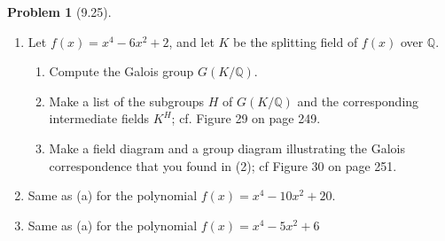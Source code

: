 \documentclass[12pt]{article}
\theoremstyle{definition}
\newtheorem{problem}{Problem}
\begin{document}
\begin{problem}[9.25]
    \phantom{.}
    \begin{enumerate}[label=(\alph*)]
        \item Let $f(x) = x^4 - 6x^2 + 2$, and let $K$ be the splitting field of $f(x)$ over $\mathbb{Q}$.
              \begin{enumerate}[label=(\arabic*)]
                  \item Compute the Galois group $G(K/\mathbb{Q})$.
                  \begin{solution}

                  \end{solution}

                  \item Make a list of the subgroups $H$ of $G(K/\mathbb{Q})$ and the corresponding intermediate fields $K^H$; cf. Figure 29 on page 249.
                  \begin{solution}

                  \end{solution}

                  \item Make a field diagram and a group diagram illustrating the Galois correspondence that you found in (2); cf Figure 30 on page 251.
                  \begin{solution}

                  \end{solution}
              \end{enumerate}

        \item Same as (a) for the polynomial $f(x) = x^4 - 10x^2 + 20$.
        \begin{solution}

        \end{solution}

        \item Same as (a) for the polynomial $f(x) = x^4 - 5x^2 + 6$
        \begin{solution}

        \end{solution}
    \end{enumerate}
\end{problem}
\end{document}
